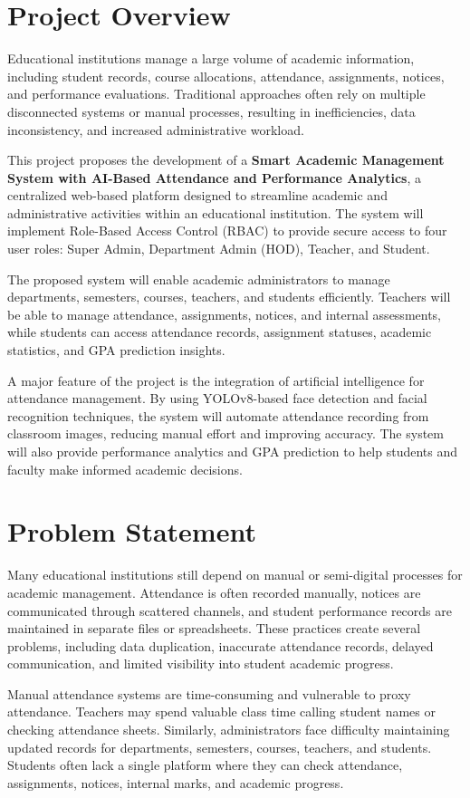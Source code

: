 \documentclass[12pt,a4paper,oneside]{report}
\let\oldsection\section
\renewcommand{\section}{\clearpage\oldsection}
\begin{document}
\section{Project Overview}
Educational institutions manage a large volume of academic information, including student records, course allocations, attendance, assignments, notices, and performance evaluations. Traditional approaches often rely on multiple disconnected systems or manual processes, resulting in inefficiencies, data inconsistency, and increased administrative workload.

This project proposes the development of a \textbf{Smart Academic Management System with AI-Based Attendance and Performance Analytics}, a centralized web-based platform designed to streamline academic and administrative activities within an educational institution. The system will implement Role-Based Access Control (RBAC) to provide secure access to four user roles: Super Admin, Department Admin (HOD), Teacher, and Student.

The proposed system will enable academic administrators to manage departments, semesters, courses, teachers, and students efficiently. Teachers will be able to manage attendance, assignments, notices, and internal assessments, while students can access attendance records, assignment statuses, academic statistics, and GPA prediction insights.

A major feature of the project is the integration of artificial intelligence for attendance management. By using YOLOv8-based face detection and facial recognition techniques, the system will automate attendance recording from classroom images, reducing manual effort and improving accuracy. The system will also provide performance analytics and GPA prediction to help students and faculty make informed academic decisions.

\section{Problem Statement}
Many educational institutions still depend on manual or semi-digital processes for academic management. Attendance is often recorded manually, notices are communicated through scattered channels, and student performance records are maintained in separate files or spreadsheets. These practices create several problems, including data duplication, inaccurate attendance records, delayed communication, and limited visibility into student academic progress.

Manual attendance systems are time-consuming and vulnerable to proxy attendance. Teachers may spend valuable class time calling student names or checking attendance sheets. Similarly, administrators face difficulty maintaining updated records for departments, semesters, courses, teachers, and students. Students often lack a single platform where they can check attendance, assignments, notices, internal marks, and academic progress.
\end{document}
